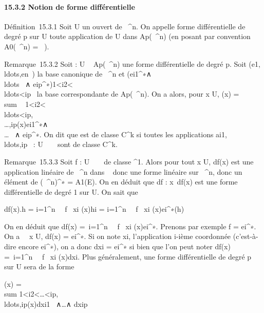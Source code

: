 \paragraph{15.3.2 Notion de forme différentielle}

Définition~15.3.1 Soit U un ouvert de ~^n. On appelle forme
différentielle de degré p sur U toute application de U dans
Ap(~^n) (en posant par convention
A0(~^n) = ~).

Remarque~15.3.2 Soit \omega : U \rightarrow~ Ap(~^n) une forme
différentielle de degré p. Soit
(e1,\\ldots,en~)
la base canonique de ~^n et
(ei1^∗∧\\ldots~
∧
eip^∗)1\textless{}i2\textless{}\\ldots\textless{}ip\leqn~
la base correspondante de Ap(~^n). On a alors, pour
x \in U, \omega(x) = \\sum ~
1\textless{}i2\textless{}\\ldots\textless{}ip,\\\ldots,ip(x)ei1^∗∧\\\ldots~
∧ eip^∗. On dit que \omega est de classe
C^k si toutes les applications
ai1,\\ldots,ip~
: U \rightarrow~ ~ sont de classe C^k.

Remarque~15.3.3 Soit f : U \rightarrow~ ~ de classe ^1. Alors pour tout
x \in U, df(x) est une application linéaire de ~^n dans ~ donc
une forme linéaire sur ~^n, donc un élément de
(~^n)^∗ = A1(E). On en déduit que df :
x\mapsto~df(x) est une forme différentielle de degré
1 sur U. On sait que

df(x).h = \sum i=1^n~ \partial~f
\over \partial~xi (x)hi =
\sum i=1^n~ \partial~f
\over \partial~xi (x)ei^∗(h)

On en déduit que df(x) =\
\sum  i=1^n~ \partial~f
\over \partial~xi (x)ei^∗. Prenons
par exemple f = ei^∗. On a \forall~~x
\in U, df(x) = ei^∗. Si on note xi,
l'application i-ième coordonnée (c'est-à-dire encore
ei^∗), on a donc dxi = ei^∗
si bien que l'on peut noter df(x) =\
\sum  i=1^n~ \partial~f
\over \partial~xi (x)dxi. Plus
généralement, une forme différentielle de degré p sur U sera de la forme

\omega(x) = \\sum
1\textless{}i2\textless{}\ldots\textless{}ip,\\ldots,ip(x)dxi1~
∧\ldots ∧ dxip~

